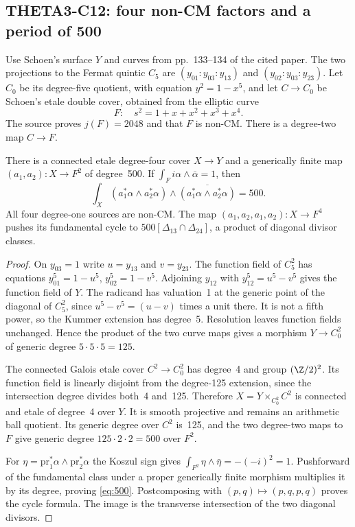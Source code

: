 \subsection{THETA3-C12: four non-CM factors and a period of 500}\label{C12}
Use Schoen's surface $Y$ and curves from pp.~133--134 of the cited paper. The two projections to the Fermat quintic $C_5$ are
$(y_{01}:y_{03}:y_{13})$ and $(y_{02}:y_{03}:y_{23})$.
Let $C_0$ be its degree-five quotient, with equation $y^2=1-x^5$, and let $C\to C_0$ be Schoen's etale double cover, obtained from the elliptic curve
\[
 F:\quad s^2=1+x+x^2+x^3+x^4.
\]
The source proves $j(F)=2048$ and that $F$ is non-CM. There is a degree-two map $C\to F$.

There is a connected etale degree-four cover $X\to Y$ and a generically finite map $(a_1,a_2):X\to F^2$ of degree~500. If
$\int_F i\alpha\wedge\bar\alpha=1$, then
\begin{equation}\label{eq:500}
 \int_X(a_1^*\alpha\wedge a_2^*\alpha)
 \wedge\overline{(a_1^*\alpha\wedge a_2^*\alpha)}=500.
\end{equation}
All four degree-one sources are non-CM. The map
$(a_1,a_2,a_1,a_2):X\to F^4$ pushes its fundamental cycle to
$500[\Delta_{13}\cap\Delta_{24}]$, a product of diagonal divisor classes.
\begin{proof}
On $y_{03}=1$ write $u=y_{13}$ and $v=y_{23}$. The function field of $C_5^2$ has equations
$y_{01}^5=1-u^5$, $y_{02}^5=1-v^5$. Adjoining $y_{12}$ with
$y_{12}^5=u^5-v^5$ gives the function field of $Y$. The radicand has valuation~1 at the generic point of the diagonal of $C_5^2$, since $u^5-v^5=(u-v)$ times a unit there. It is not a fifth power, so the Kummer extension has degree~5. Resolution leaves function fields unchanged. Hence the product of the two curve maps gives a morphism $Y\to C_0^2$ of generic degree $5\cdot5\cdot5=125$.

The connected Galois etale cover $C^2\to C_0^2$ has degree~4 and group $(\Z/2)^2$. Its function field is linearly disjoint from the degree-125 extension, since the intersection degree divides both~4 and~125. Therefore
$X=Y\times_{C_0^2}C^2$ is connected and etale of degree~4 over $Y$. It is smooth projective and remains an arithmetic ball quotient. Its generic degree over $C^2$ is~125, and the two degree-two maps to $F$ give generic degree $125\cdot2\cdot2=500$ over $F^2$.

For $\eta=\mathrm{pr}_1^*\alpha\wedge\mathrm{pr}_2^*\alpha$ the Koszul sign gives
$\int_{F^2}\eta\wedge\bar\eta=-(-i)^2=1$.
Pushforward of the fundamental class under a proper generically finite morphism multiplies it by its degree, proving \eqref{eq:500}. Postcomposing with $(p,q)\mapsto(p,q,p,q)$ proves the cycle formula. The image is the transverse intersection of the two diagonal divisors.
\end{proof}
